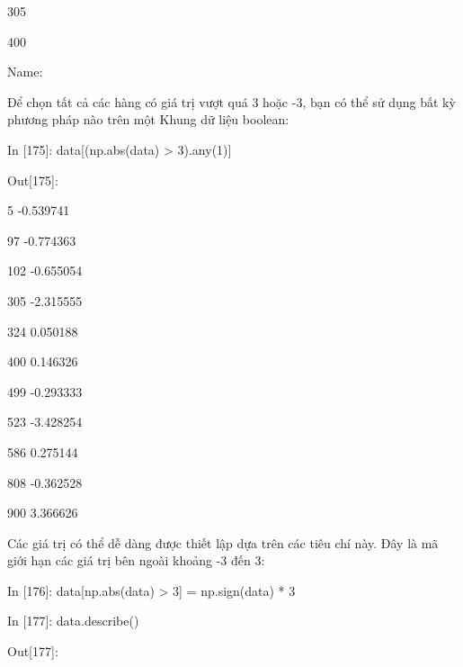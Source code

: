     \quad\textup{305   }\par
    \quad\textup{400   }\par
    \quad\textup{Name: }\par 
Để chọn tất cả các hàng có giá trị vượt quá 3 hoặc -3, bạn có thể sử dụng bất kỳ phương pháp nào trên một Khung dữ liệu boolean:\par
    \quad\textup{In [175]: data[(np.abs(data) > 3).any(1)]  }\par
    \quad\textup{Out[175]:   }\par
    \quad\textup{\quad\quad{} \quad\quad\quad{} \quad\quad\quad{}\quad\quad\quad{} }\par 
    \quad\textup{5   -0.539741   }\par
    \quad\textup{97  -0.774363   }\par
    \quad\textup{102 -0.655054 }\par
    \quad\textup{305 -2.315555 }\par
    \quad\textup{324  0.050188  }\par
    \quad\textup{400  0.146326  }\par
    \quad\textup{499 -0.293333  }\par
    \quad\textup{523 -3.428254  }\par
    \quad\textup{586  0.275144  }\par
    \quad\textup{808 -0.362528  }\par
    \quad\textup{900  3.366626  }\par
Các giá trị có thể dễ dàng được thiết lập dựa trên các tiêu chí này. Đây là mã giới hạn các giá trị bên ngoài 
khoảng -3 đến 3:\par
    \quad\textup{In [176]: data[np.abs(data) > 3] = np.sign(data) * 3  }\par
    \quad\textup{In [177]: data.describe() }\par
    \quad\textup{Out[177]: }\par
    \quad\textup{\quad\quad\quad\quad\quad\quad{} \quad\quad\quad\quad{} \quad\quad\quad{}\quad\quad\quad\quad{} }\par 
